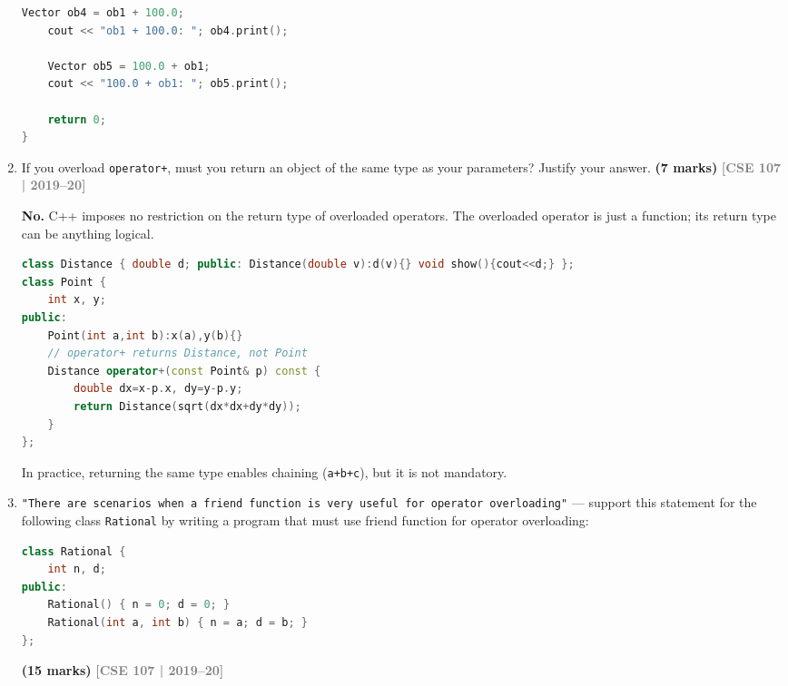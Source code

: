 \documentclass[12pt,a3paper]{article}
\newcommand{\yr}[1]{\hfill\textcolor{gray}{\small\textbf{[#1]}}}
\newcommand{\mk}[1]{\textcolor{orange!70!black}{\small\textbf{(#1 marks)}}}
\begin{document}
\begin{enumerate}
\begin{tcolorbox}
\begin{lstlisting}[language=C++]
    Vector ob4 = ob1 + 100.0;
    cout << "ob1 + 100.0: "; ob4.print();

    Vector ob5 = 100.0 + ob1;
    cout << "100.0 + ob1: "; ob5.print();

    return 0;
}
\end{lstlisting}
\end{tcolorbox}

\item If you overload \texttt{operator+}, must you return an object of the same type as your parameters? Justify your answer. \mk{7}
\yr{CSE 107 | 2019--20}


\begin{tcolorbox}[enhanced,breakable,ansbox,colback=cF!4,colframe=cF,
  boxrule=0.8pt,arc=5pt,
  title={\textbf{Answer --- Must operator+ return same type as parameters?}},
  fonttitle=\bfseries\color{white},colbacktitle=cF]

\textbf{No.} C++ imposes no restriction on the return type of
overloaded operators.  The overloaded operator is just a function;
its return type can be anything logical.

\begin{lstlisting}[language=C++]
class Distance { double d; public: Distance(double v):d(v){} void show(){cout<<d;} };
class Point {
    int x, y;
public:
    Point(int a,int b):x(a),y(b){}
    // operator+ returns Distance, not Point
    Distance operator+(const Point& p) const {
        double dx=x-p.x, dy=y-p.y;
        return Distance(sqrt(dx*dx+dy*dy));
    }
};
\end{lstlisting}

In practice, returning the same type enables chaining
(\texttt{a+b+c}), but it is not mandatory.

\end{tcolorbox}

\item \texttt{"There are scenarios when a friend function is very useful for operator overloading"} --- support this statement for the following class \texttt{Rational} by writing a program that must use friend function for operator overloading:
\begin{lstlisting}[language=C++]
class Rational {
    int n, d;
public:
    Rational() { n = 0; d = 0; }
    Rational(int a, int b) { n = a; d = b; }
};
\end{lstlisting}
\mk{15}
\yr{CSE 107 | 2019--20}


\begin{tcolorbox}[enhanced,breakable,ansbox,colback=cF!4,colframe=cF,
  boxrule=0.8pt,arc=5pt,
  title={\textbf{Answer --- Rational class with friend operator overloading}},
  fonttitle=\bfseries\color{white},colbacktitle=cF]


\end{tcolorbox}
\end{enumerate}
\end{document}
